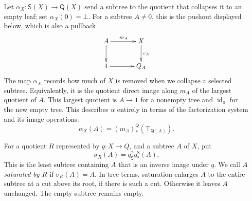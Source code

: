 \documentclass[11pt,a4paper]{article}
\theoremstyle{plain}
\theoremstyle{definition}
\theoremstyle{remark}
\newcommand{\id}{\operatorname{id}}
\begin{document}
\label{not:subtree-collapse}
Let
$\alpha_X:\mathsf S(X)\to\mathsf Q(X)$ send a subtree to
the quotient that collapses it to an empty leaf; set
$\alpha_X(0)=\bot$. For a subtree $A\ne0$, this is the
pushout displayed below, which is also a pullback
\[
 \xymatrix@C=3.5em@R=2.3em{
 A\ar[r]^{m_A}\ar[d]&X\ar[d]^{c_A}\\
 1\ar[r]&Q_A
 }
\]
The map $\alpha_X$ records how much of $X$ is removed when
we collapse a selected subtree. Equivalently, it is the quotient
direct image along $m_A$ of the largest quotient of $A$. This
largest quotient is $A\to1$ for a nonempty tree and $\id_0$ for
the new empty tree. This describes $\alpha$ entirely in terms
of the factorization system and its image operations:
\[
 \alpha_X(A)=(m_A)_*^{\mathsf Q}
                 (\top_{\mathsf Q(A)}).
\]

\label{not:subtree-saturation}
For a quotient $R$ represented by $q:X\to Q$, and a subtree
$A$ of $X$, put
\[
 \sigma_R(A)=q_{\mathsf S}^*q_*^{\mathsf S}(A).
\]
This is the least subtree containing $A$ that is an inverse
image under $q$. We call $A$ \emph{saturated by $R$} if
$\sigma_R(A)=A$. In tree terms, saturation enlarges $A$ to
the entire subtree at a cut above its root, if there is such a
cut. Otherwise it leaves $A$ unchanged. The empty subtree
remains empty.
\end{document}
